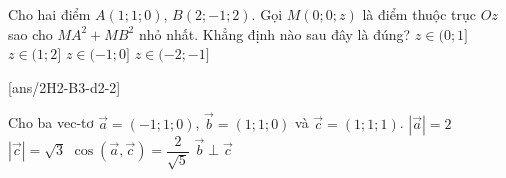 \begin{ex}
	Cho hai điểm $A(1;1;0)$, $B(2;-1;2)$. Gọi $M(0;0;z)$ là điểm thuộc trục $Oz$ sao cho $MA^2+MB^2$ nhỏ nhất. Khẳng định nào sau đây là đúng?
	\choice
	{\True $z \in (0;1]$}
	{$z \in (1;2]$}
	{$z \in (-1;0]$}
	{$z \in (-2;-1]$}

\end{ex} 


\BTTF
{}[ans/2H2-B3-d2-2]

\begin{ex}
	Cho ba vec-tơ $ \overrightarrow a=(-1;1;0)$, $ \overrightarrow b=(1;1;0)$ và $ \overrightarrow c=(1;1;1)$.
	\choiceTF
	{$\left| {\overrightarrow a } \right| = 2$}
	{\True $\left| {\overrightarrow c } \right| = \sqrt 3 $}
	{$\cos\left(\vec{a},\vec{c} \right)=\dfrac{2}{\sqrt{5}}$}
	{ $\overrightarrow b \perp \overrightarrow c$}
\end{ex} 


